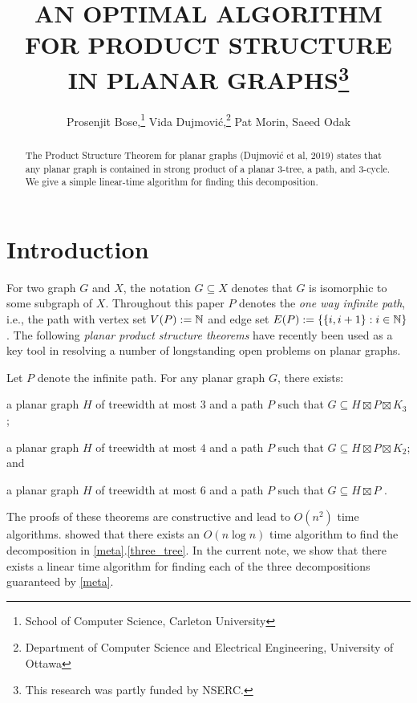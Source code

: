 \documentclass{patmorin}
\title{\MakeUppercase{An Optimal Algorithm for Product Structure in Planar Graphs}\thanks{This research was partly funded by NSERC.}}
\author{%
  Prosenjit Bose,\thanks{School of Computer Science, Carleton University}\qquad
  Vida Dujmović,\thanks{Department of Computer Science and Electrical Engineering, University of Ottawa}\qquad
  Pat Morin,\footnotemark[1]\qquad
  Saeed Odak\footnotemark[2]}
\date{}
\begin{document}
\maketitle

\begin{abstract}
  The Product Structure Theorem for planar graphs (Dujmović et al, 2019) states that any planar graph is contained in strong product of a planar $3$-tree, a path, and $3$-cycle.  We give a simple linear-time algorithm for finding this decomposition.
\end{abstract}

%

\section{Introduction}

For two graph $G$ and $X$, the notation $G\subseteq X$ denotes that $G$ is isomorphic to some subgraph of $X$.  Throughout this paper $P$ denotes the \emph{one way infinite path}, i.e., the path with vertex set $V(P):=\mathbb{N}$ and edge set $E(P):=\{\{i,i+1\}:i\in\mathbb{N}\}$.  The following \emph{planar product structure theorems} have recently been used as a key tool in resolving a number of longstanding open problems on planar graphs.

\begin{thm}\label{meta}
  Let $P$ denote the infinite path.  For any planar graph $G$, there exists:
  \begin{compactenum}[(a)]
    \item \label{three_tree} a planar graph $H$ of treewidth at most $3$ and a path $P$ such that $G\subseteq H\boxtimes P\boxtimes K_3$ \cite{dujmovic.joret.ea:planar};
    \item a planar graph $H$ of treewidth at most $4$ and a path $P$ such that $G\subseteq H\boxtimes P\boxtimes K_2$; and
    \item a planar graph $H$ of treewidth at most $6$ and a path $P$ such that $G\subseteq H\boxtimes P$ \cite{ueckerdt.wood.ea:XX}.
  \end{compactenum}
\end{thm}

The proofs of these theorems are constructive and lead to $O(n^2)$ time algorithms.  \citet{morin:fast} showed that there exists an $O(n\log n)$ time algorithm to find the decomposition in \cref{meta}.\ref{three_tree}.  In the current note, we show that there exists a linear time algorithm for finding each of the three decompositions guaranteed by \cref{meta}.
\end{document}
